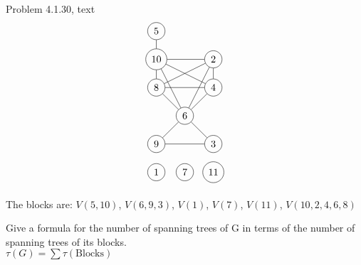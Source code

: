 \documentclass[12pt]{article}
\newenvironment{question}[2][Question]{\begin{trivlist}
\item[\hskip \labelsep {\bfseries #1}\hskip \labelsep {\bfseries #2.}]}{\end{trivlist}}
\begin{document}
\begin{question}{4} Problem 4.1.30, text
\begin{align*}
\begin{tikzpicture}
\node[shape=circle,draw=black] (A) at (0,5) {5};
\node[shape=circle,draw=black] (B) at (0,4) {10};
\node[shape=circle,draw=black] (C) at (2,4) {2};
\node[shape=circle,draw=black] (D) at (0,3) {8};
\node[shape=circle,draw=black] (E) at (2,3) {4};
\node[shape=circle,draw=black] (F) at (1,2) {6};
\node[shape=circle,draw=black] (G) at (0,1) {9};
\node[shape=circle,draw=black] (H) at (2,1) {3};
\node[shape=circle,draw=black] (I) at (0,0) {1};
\node[shape=circle,draw=black] (I) at (1,0) {7};
\node[shape=circle,draw=black] (I) at (2,0) {11};
\path [] (A) edge node[left] {} (B);
\path [] (B) edge node[left] {} (C);
\path [] (B) edge node[left] {} (D);
\path [] (B) edge node[left] {} (E);
\path [] (B) edge node[left] {} (F);
\path [] (C) edge node[left] {} (D);
\path [] (C) edge node[left] {} (E);
\path [] (C) edge node[left] {} (F);
\path [] (D) edge node[left] {} (E);
\path [] (D) edge node[left] {} (F);
\path [] (E) edge node[left] {} (F);
\path [] (F) edge node[left] {} (G);
\path [] (F) edge node[left] {} (H);
\path [] (G) edge node[left] {} (H);
\end{tikzpicture}
\end{align*}

The blocks are: $V(5, 10) $, $V(6,9,3)$, $V(1)$, $V(7)$, $V(11)$, $V(10,2,4,6,8)$
\end{question}

\begin{question}{5}
	Give a formula for the number of spanning trees of G in terms of the number of spanning trees of its blocks.	\\
	$\tau(G) = \sum{\tau(\text{Blocks})}$
\end{question}

\begin{question}{6}
\end{question}

\begin{question}{7}
\end{question}

\begin{question}{8}
\end{question}

\begin{question}{9}
\end{question}

\begin{question}{10}
\end{question}


\end{document}
